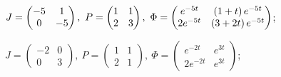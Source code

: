 \begin{enumsolsfull}
		\item \( J = \begin{pmatrix} -5 & 1 \\ 0 & -5 \end{pmatrix}, ~ P = \begin{pmatrix} 1 & 1 \\ 2 & 3 \end{pmatrix}, ~ \Phi = \begin{pmatrix} e^{-5t} & \left( 1 + t \right)e^{-5t} \\ 2e^{-5t} & \left( 3 + 2t \right) e^{-5t} \end{pmatrix} \); %
		\item \( J = \begin{pmatrix} -2 & 0 \\ 0 & 3 \end{pmatrix}, ~ P = \begin{pmatrix} 1 & 1 \\ 2 & 1 \end{pmatrix}, ~ \Phi = \begin{pmatrix} e^{-2t} & e^{3t} \\ 2e^{-2t} & e^{3t} \end{pmatrix} \); %

\end{enumsolsfull}
